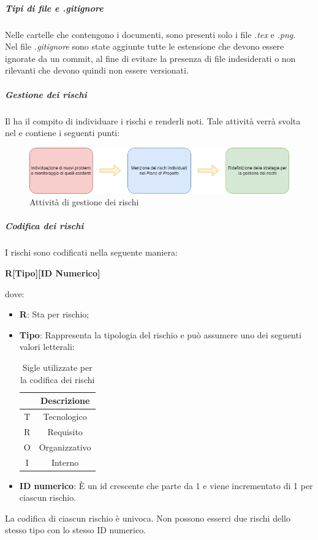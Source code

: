 \subparagraph{Tipi di file e \textit{.gitignore}}
Nelle cartelle che contengono i documenti, sono presenti solo i file \textit{.tex} e \textit{.png}.\\
Nel file \textit{.gitignore} sono state aggiunte tutte le estensione che devono essere ignorate da un commit, al fine di evitare la presenza di file indesiderati
o non rilevanti che devono quindi non essere versionati.
\subparagraph {Gestione dei rischi}
Il \roleProjectManagerLow{} ha il compito di individuare i rischi e renderli noti. Tale attività verrà svolta nel \docNamePdPLow{} e contiene i seguenti punti:
\begin{figure}[htbp]
\centering
\includegraphics[scale =0.65]{../template/images/NdP/GestioneRischi.png}
\caption{Attività di gestione dei rischi}
\end {figure}

\subparagraph {Codifica dei rischi}
I rischi sono codificati nella seguente maniera: \\
\begin{center}
  \textbf{\Large{R[Tipo][ID Numerico]}}
\end{center}
dove:
\begin{itemize}[label={}]
  \item \textbf{R}: Sta per rischio;
  \item \textbf{Tipo}: Rappresenta la tipologia del rischio e può assumere uno dei seguenti valori letterali:
        \begin{table}[H]
          \centering
          \renewcommand{\arraystretch}{1.8}
          \begin{tabular}{c|c}
            \rowcolor[HTML]{125E28}
            \multicolumn{1}{c}{\color[HTML]{FFFFFF}\textbf{Sigla}}
              & \multicolumn{1}{c}{\color[HTML]{FFFFFF}\textbf{Descrizione}} \\
            \hline
            T & Tecnologico                                                  \\
            R & Requisito                                                    \\
            O & Organizzativo                                                \\
            I & Interno                                                      \\
          \end{tabular}
          \caption{Sigle utilizzate per la codifica dei rischi}
        \end{table}
  \item \textbf{ID numerico}: È un id crescente che parte da 1 e viene incrementato di 1 per ciascun rischio.\\
\end{itemize}
La codifica di ciascun rischio è univoca. Non possono esserci due rischi dello stesso tipo con lo stesso ID numerico.

